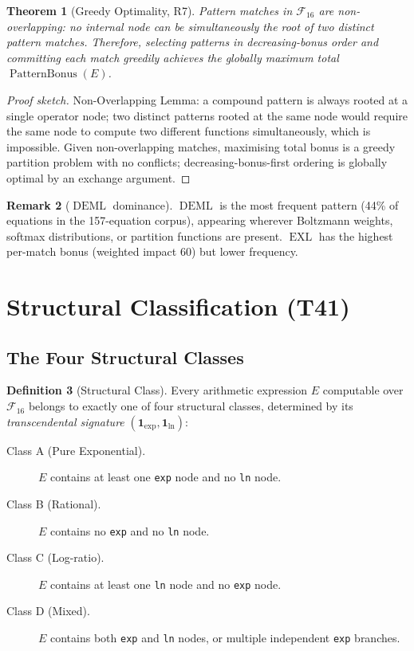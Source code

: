 \documentclass[12pt,a4paper]{article}
\newtheorem{theorem}{Theorem}[section]
\theoremstyle{definition}
\newtheorem{definition}[theorem]{Definition}
\newtheorem{remark}[theorem]{Remark}
\newcommand{\EXL}{\operatorname{EXL}}
\newcommand{\DEML}{\operatorname{DEML}}
\newcommand{\PB}{\operatorname{PatternBonus}}
\begin{document}
\begin{theorem}[Greedy Optimality, R7]
\label{thm:greedy}
Pattern matches in $\mathcal{F}_{16}$ are \emph{non-overlapping}: no
internal node can be simultaneously the root of two distinct pattern matches.
Therefore, selecting patterns in decreasing-bonus order and committing each
match greedily achieves the globally maximum total $\PB(E)$.
\end{theorem}

\begin{proof}[Proof sketch]
Non-Overlapping Lemma: a compound pattern is always rooted at a single
operator node; two distinct patterns rooted at the same node would require
the same node to compute two different functions simultaneously, which is
impossible.  Given non-overlapping matches, maximising total bonus is a
greedy partition problem with no conflicts; decreasing-bonus-first ordering
is globally optimal by an exchange argument.
\end{proof}

\begin{remark}[$\DEML$ dominance]
$\DEML$ is the most frequent pattern (44\% of equations in the 157-equation
corpus), appearing wherever Boltzmann weights, softmax distributions, or
partition functions are present.  $\EXL$ has the highest per-match bonus
(weighted impact 60) but lower frequency.
\end{remark}

\section{Structural Classification (T41)}
\label{sec:classes}

\subsection{The Four Structural Classes}

\begin{definition}[Structural Class]
\label{def:class}
Every arithmetic expression $E$ computable over $\mathcal{F}_{16}$ belongs
to exactly one of four structural classes, determined by its
\emph{transcendental signature} $(\mathbf{1}_{\mathrm{exp}},
\mathbf{1}_{\mathrm{ln}})$:
\begin{description}
  \item[Class A (Pure Exponential).]
        $E$ contains at least one \texttt{exp} node and no \texttt{ln} node.
  \item[Class B (Rational).]
        $E$ contains no \texttt{exp} and no \texttt{ln} node.
  \item[Class C (Log-ratio).]
        $E$ contains at least one \texttt{ln} node and no \texttt{exp} node.
  \item[Class D (Mixed).]
        $E$ contains both \texttt{exp} and \texttt{ln} nodes, or multiple
        independent \texttt{exp} branches.
\end{description}
\end{definition}
\end{document}

